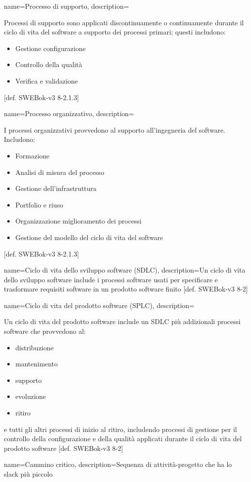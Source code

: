 {
name=Processo di supporto,
description={Processi di supporto sono applicati discontinuamente o continuamente durante il ciclo di vita del software a supporto dei processi primari; questi includono:\begin{itemize}
\item Gestione configurazione
\item Controllo della qualit\`a
\item Verifica e validazione
\end{itemize}
[def. SWEBok-v3 8-2.1.3]}
}

{
name=Processo organizzativo,
description={I processi organizzativi provvedono al supporto all'ingegneria del software. Includono: \begin{itemize}
\item Formazione
\item Analisi di misura del processo
\item Gestione dell'infrastruttura
\item Portfolio e riuso
\item Organizzazione miglioramento dei processi
\item Gestione del modello del ciclo di vita del software
\end{itemize}
[def. SWEBok-v3 8-2.1.3]}
}

{
name=Ciclo di vita dello sviluppo software (SDLC),
description={Un ciclo di vita dello sviluppo software include i processi software usati per specificare e trasformare requisiti software in un prodotto software finito [def. SWEBok-v3 8-2]}
}

{
name=Ciclo di vita del prodotto software (SPLC),
description={Un ciclo di vita del prodotto software include un SDLC più addizionali processi software che provvedono al: \begin{itemize}
\item distribuzione
\item mantenimento
\item supporto
\item evoluzione
\item ritiro
\end{itemize}
e tutti gli altri processi di inizio al ritiro, includendo processi di gestione per il controllo della configurazione e della qualità applicati durante il ciclo di vita del prodotto software [def. SWEBok-v3 8-2]}
}

{
name=Cammino critico,
description={Sequenza di attività-progetto che ha lo slack più piccolo}
}

